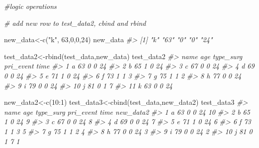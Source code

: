 \documentclass[
]{book}
\newenvironment{Shaded}{\begin{snugshade}}{\end{snugshade}}
\newcommand{\CommentTok}[1]{\textcolor[rgb]{0.56,0.35,0.01}{\textit{#1}}}
\newcommand{\DecValTok}[1]{\textcolor[rgb]{0.00,0.00,0.81}{#1}}
\newcommand{\FunctionTok}[1]{\textcolor[rgb]{0.00,0.00,0.00}{#1}}
\newcommand{\NormalTok}[1]{#1}
\newcommand{\OtherTok}[1]{\textcolor[rgb]{0.56,0.35,0.01}{#1}}
\newcommand{\SpecialCharTok}[1]{\textcolor[rgb]{0.00,0.00,0.00}{#1}}
\newcommand{\StringTok}[1]{\textcolor[rgb]{0.31,0.60,0.02}{#1}}
\begin{document}
\begin{Shaded}
\begin{Highlighting}[]
\CommentTok{\#logic operations}

\CommentTok{\# add new row to test\_data2, cbind and rbind}

\NormalTok{new\_data}\OtherTok{\textless{}{-}}\FunctionTok{c}\NormalTok{(}\StringTok{"k"}\NormalTok{, }\DecValTok{63}\NormalTok{,}\DecValTok{0}\NormalTok{,}\DecValTok{0}\NormalTok{,}\DecValTok{24}\NormalTok{)}
\NormalTok{new\_data}
\CommentTok{\#\textgreater{} [1] "k"  "63" "0"  "0"  "24"}

\NormalTok{test\_data2}\OtherTok{\textless{}{-}}\FunctionTok{rbind}\NormalTok{(test\_data,new\_data)}
\NormalTok{test\_data2}
\CommentTok{\#\textgreater{}    name age type\_surg pri\_event time}
\CommentTok{\#\textgreater{} 1     a  63         0         0   24}
\CommentTok{\#\textgreater{} 2     b  65         1         0   24}
\CommentTok{\#\textgreater{} 3     c  67         0         0   24}
\CommentTok{\#\textgreater{} 4     d  69         0         0   24}
\CommentTok{\#\textgreater{} 5     e  71         1         0   24}
\CommentTok{\#\textgreater{} 6     f  73         1         1    3}
\CommentTok{\#\textgreater{} 7     g  75         1         1    2}
\CommentTok{\#\textgreater{} 8     h  77         0         0   24}
\CommentTok{\#\textgreater{} 9     i  79         0         0   24}
\CommentTok{\#\textgreater{} 10    j  81         0         1    7}
\CommentTok{\#\textgreater{} 11    k  63         0         0   24}

\NormalTok{new\_data2}\OtherTok{\textless{}{-}}\FunctionTok{c}\NormalTok{(}\DecValTok{10}\SpecialCharTok{:}\DecValTok{1}\NormalTok{)}
\NormalTok{test\_data3}\OtherTok{\textless{}{-}}\FunctionTok{cbind}\NormalTok{(test\_data,new\_data2)}
\NormalTok{test\_data3}
\CommentTok{\#\textgreater{}    name age type\_surg pri\_event time new\_data2}
\CommentTok{\#\textgreater{} 1     a  63         0         0   24        10}
\CommentTok{\#\textgreater{} 2     b  65         1         0   24         9}
\CommentTok{\#\textgreater{} 3     c  67         0         0   24         8}
\CommentTok{\#\textgreater{} 4     d  69         0         0   24         7}
\CommentTok{\#\textgreater{} 5     e  71         1         0   24         6}
\CommentTok{\#\textgreater{} 6     f  73         1         1    3         5}
\CommentTok{\#\textgreater{} 7     g  75         1         1    2         4}
\CommentTok{\#\textgreater{} 8     h  77         0         0   24         3}
\CommentTok{\#\textgreater{} 9     i  79         0         0   24         2}
\CommentTok{\#\textgreater{} 10    j  81         0         1    7         1}


\end{Highlighting}
\end{Shaded}
\end{document}
